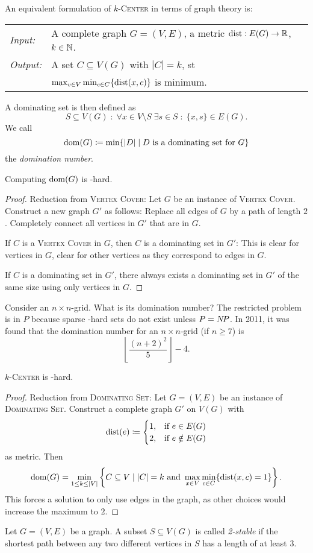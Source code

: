 \documentclass[../skript.tex]{subfiles}
\begin{document}
An equivalent formulation of \textsc{$k$-Center} in terms of graph theory is:
\begin{problem}[$k$-Center]
\begin{tabular}{ll}
\textit{Input:} & A complete graph $G = (V, E)$, a metric $\operatorname*{dist} : E(G) \to \mathbb{R}$, $k \in \mathbb{N}$. \\
\textit{Output:} & A set $C \subseteq V(G)$ with $|C| = k$, \ac{st} \\
&$\max_{v \in V} \min_{c \in C} \{\operatorname*{dist}(x, c)\}$ is minimum.
\end{tabular}
\end{problem}
A dominating set is then defined as
\[
	S \subseteq V(G) \; : \; \forall x \in V \setminus S \; \exists s \in S \; : \; \{ x, s \} \in E(G).
\]
We call
\[
	\operatorname{dom}(G) \coloneqq \min \{ |D| \mid D \text{ is a dominating set for } G \}
\]
the \emph{domination number}.
\begin{theorem} %
\label{thm:23}
Computing $\operatorname{dom}(G)$ is \NP-hard.
\end{theorem}
\begin{proof}
Reduction from \textsc{Vertex Cover}: Let $G$ be an instance of \textsc{Vertex Cover}.
Construct a new graph $G'$ as follows: Replace all edges of $G$ by a path of length $2$.
Completely connect all vertices in $G'$ that are in $G$.

If $C$ is a \textsc{Vertex Cover} in $G$, then $C$ is a dominating set in $G'$: This is clear for vertices in $G$, clear for other vertices as they correspond to edges in $G$.

If $C$ is a dominating set in $G'$, there always  exists a dominating set in $G'$ of the same size using only vertices in $G$.
\end{proof}
Consider an $n \times n$-grid. What is its domination number? The restricted problem is in $P$ because sparse \NP-hard sets do not exist unless $P = N \! P$.
In 2011, it was found that the domination number for an $n \times n$-grid (if $n \geq 7$) is
\[
	\left\lfloor \frac{(n+2)^2}{5} \right\rfloor - 4.
\]
\begin{theorem} %
\label{thm:24}
\textsc{$k$-Center} is \NP-hard.
\end{theorem}
\begin{proof}
Reduction from \textsc{Dominating Set}: Let $G = (V, E)$ be an instance of \textsc{Dominating Set}.
Construct a complete graph $G'$ on $V(G)$ with
\[
\operatorname*{dist}(e) \coloneqq \begin{cases}
1, & \text{if } e \in E(G) \\
2, & \text{if } e \notin E(G)
\end{cases}
\]
as metric.
Then
\[
	\operatorname{dom}(G) = \min_{1 \leq k \leq |V|} \left\{ C \subseteq V \mid |C| = k \text{ and } \max_{x \in V} \min_{c \in C} \{ \operatorname*{dist}(x, c) = 1 \} \right\}.
\]
This forces a solution to only use edges in the graph, as other choices would increase the maximum to $2$.
\end{proof}
Let $G = (V, E)$ be a graph. A subset $S \subseteq V(G)$ is called \emph{2-stable} if the shortest path between any two different vertices in $S$ has a length of at least $3$.
\end{document}
